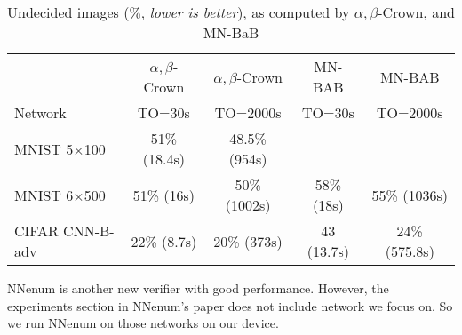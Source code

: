 \begin{table}[h!]
	\centering
		\caption{Undecided images ($\%$, {\em lower is better}), as computed by $\alpha,\beta$-Crown, and MN-BaB}
	\begin{tabular}{||l||c|c||c|c||}
		\hline \hline
		 & $\alpha,\beta$-Crown & $\alpha,\beta$-Crown & MN-BAB & MN-BAB \\ 
		 Network & TO=30s & TO=2000s &  TO=30s & TO=2000s \\ 
		\hline
		MNIST 5$\times$100 & 51\% (18.4s) & 48.5\%(954s) &  & \\ \hline
		MNIST 6$\times$500 & 51\% (16s) & 50\% (1002s) & 58\% (18s) & 55\% (1036s) \\ \hline
		CIFAR CNN-B-adv & 22\% (8.7s) & 20\% (373s) & 43 (13.7s) & 24\% (575.8s) \\ \hline 
	\end{tabular}
	\end{table}



NNenum is another new verifier with good performance. However, the experiments section in NNenum's paper does not include network we focus on. So we run NNenum on those networks on our device. 

